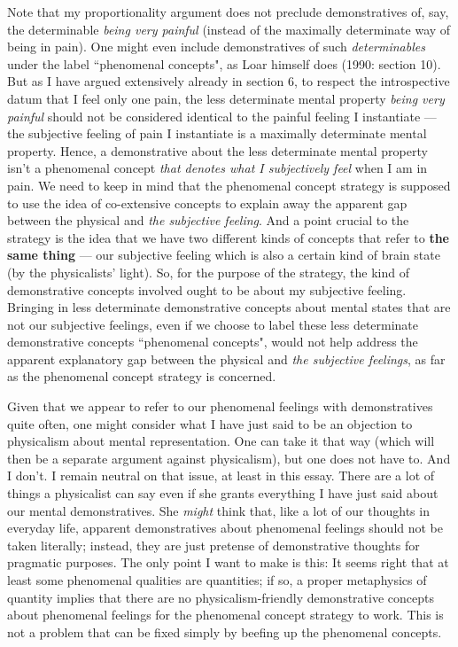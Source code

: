 \documentclass[a4paper,12pt]{article}
\begin{document}
Note that my proportionality argument does not preclude demonstratives of, say, the determinable \emph{being very painful} (instead of the maximally determinate way of being in pain). One might even include demonstratives of such \emph{determinables} under the label ``phenomenal concepts", as Loar himself does (1990: section 10). But as I have argued extensively already in section 6, to respect the introspective datum that I feel only one pain, the less determinate mental property \emph{being very painful} should not be considered identical to the painful feeling I instantiate --- the subjective feeling of pain I instantiate is a maximally determinate mental property. Hence, a demonstrative about the less determinate mental property isn't a phenomenal concept \emph{that denotes what I subjectively feel} when I am in pain. We need to keep in mind that the phenomenal concept strategy is supposed to use the idea of co-extensive concepts to explain away the apparent gap between the physical and \emph{the subjective feeling}. And a point crucial to the strategy is the idea that we have two different kinds of concepts that refer to \textbf{the same thing} --- our subjective feeling which is also a certain kind of brain state (by the physicalists' light). So, for the purpose of the strategy, the kind of demonstrative concepts involved ought to be about my subjective feeling. Bringing in less determinate demonstrative concepts about mental states that are not our subjective feelings, even if we choose to label these less determinate demonstrative concepts ``phenomenal concepts", would not help address the apparent explanatory gap between the physical and \emph{the subjective feelings}, as far as the phenomenal concept strategy is concerned.

Given that we appear to refer to our phenomenal feelings with demonstratives quite often, one might consider what I have just said to be an objection to physicalism about mental representation. One can take it that way (which will then be a separate argument against physicalism), but one does not have to. And I don't. I remain neutral on that issue, at least in this essay. There are a lot of things a physicalist can say even if she grants everything I have just said about our mental demonstratives. She \emph{might} think that, like a lot of our thoughts in everyday life, apparent demonstratives about phenomenal feelings should not be taken literally; instead, they are just pretense of demonstrative thoughts for pragmatic purposes. The only point I want to make is this: It seems right that at least some phenomenal qualities are quantities; if so, a proper metaphysics of quantity implies that there are no physicalism-friendly demonstrative concepts about phenomenal feelings for the phenomenal concept strategy to work. This is not a problem that can be fixed simply by beefing up the phenomenal concepts.\footnotemark


\nocite{*}


\end{document}
